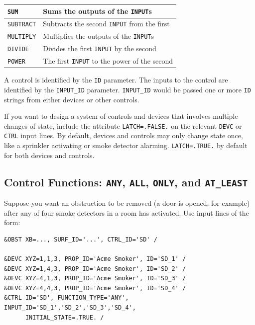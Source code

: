 \documentclass[11pt]{book}
\newcommand{\ct}{\tt\small}
\begin{document}
\begin{table}[h!]
\begin{center}
\begin{tabular}{|l||l|}
{\ct SUM}                         & Sums the outputs of the {\ct INPUT}s \\ \hline
{\ct SUBTRACT}                    & Subtracts the second {\ct INPUT} from the first \\ \hline
{\ct MULTIPLY}                    & Multiplies the outputs of the {\ct INPUT}s \\ \hline
{\ct DIVIDE}                      & Divides the first {\ct INPUT} by the second \\ \hline
{\ct POWER}                       & The first {\ct INPUT} to the power of the second \\ \hline
\end{tabular}
\end{center}
\end{table}
A control is identified by the {\ct ID} parameter.  The inputs to the control are identified
by the {\ct INPUT\_ID} parameter.  {\ct INPUT\_ID} would be passed one or more {\ct ID} strings
from either devices or other controls.


If you want to design a system of controls and devices that involves multiple changes of state,
include the attribute {\ct LATCH=.FALSE.} on the relevant {\ct DEVC} or {\ct CTRL} input lines.
By default, devices and controls may only change state once, like a sprinkler activating or
smoke detector alarming. {\ct LATCH=.TRUE.} by default for both devices and controls.

\subsection{Control Functions: \texorpdfstring{{\tt ANY}}{ANY}, \texorpdfstring{{\tt ALL}}{ALL}, \texorpdfstring{{\tt ONLY}}{ONLY}, and
\texorpdfstring{{\tt AT\_LEAST}}{AT\_LEAST}}

\label{info:FUNCTION_TYPE}

Suppose you want an obstruction to be removed (a door is opened, for example) after any
of four smoke detectors in a room has activated. Use input lines of the form:

\footnotesize
\begin{verbatim}
&OBST XB=..., SURF_ID='...', CTRL_ID='SD' /

&DEVC XYZ=1,1,3, PROP_ID='Acme Smoker', ID='SD_1' /
&DEVC XYZ=1,4,3, PROP_ID='Acme Smoker', ID='SD_2' /
&DEVC XYZ=4,1,3, PROP_ID='Acme Smoker', ID='SD_3' /
&DEVC XYZ=4,4,3, PROP_ID='Acme Smoker', ID='SD_4' /
&CTRL ID='SD', FUNCTION_TYPE='ANY', INPUT_ID='SD_1','SD_2','SD_3','SD_4',
      INITIAL_STATE=.TRUE. /
\end{verbatim}
\normalsize
\end{document}
